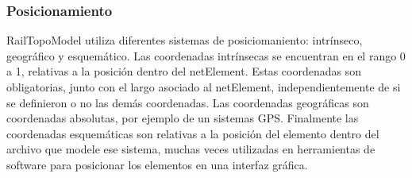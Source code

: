 \subsubsection{Posicionamiento}

    RailTopoModel utiliza diferentes sistemas de posiciomaniento: intrínseco, geográfico y esquemático. Las coordenadas intrínsecas se encuentran en el rango 0 a 1, relativas a la posición dentro del netElement. Estas coordenadas son obligatorias, junto con el largo asociado al netElement, independientemente de si se definieron o no las demás coordenadas. Las coordenadas geográficas son coordenadas absolutas, por ejemplo de un sistemas GPS. Finalmente las coordenadas esquemáticas son relativas a la posición del elemento dentro del archivo que modele ese sistema, muchas veces utilizadas en herramientas de software para posicionar los elementos en una interfaz gráfica.
